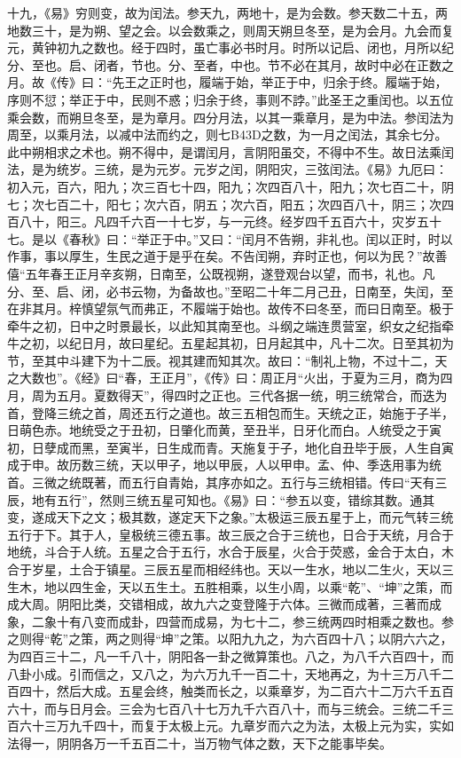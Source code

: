 \documentclass[]{article}
\begin{document}
十九，《易》穷则变，故为闰法。参天九，两地十，是为会数。参天数二十五，两地数三十，是为朔、望之会。以会数乘之，则周天朔旦冬至，是为会月。九会而复元，黄钟初九之数也。经于四时，虽亡事必书时月。时所以记启、闭也，月所以纪分、至也。启、闭者，节也。分、至者，中也。节不必在其月，故时中必在正数之月。故《传》曰：``先王之正时也，履端于始，举正于中，归余于终。履端于始，序则不愆；举正于中，民则不惑；归余于终，事则不誖。''此圣王之重闰也。以五位乘会数，而朔旦冬至，是为章月。四分月法，以其一乘章月，是为中法。参闰法为周至，以乘月法，以减中法而约之，则七B43D之数，为一月之闰法，其余七分。此中朔相求之术也。朔不得中，是谓闰月，言阴阳虽交，不得中不生。故日法乘闰法，是为统岁。三统，是为元岁。元岁之闰，阴阳灾，三弦闰法。《易》九厄曰：初入元，百六，阳九；次三百七十四，阳九；次四百八十，阳九；次七百二十，阴七；次七百二十，阳七；次六百，阴五；次六百，阳五；次四百八十，阴三；次四百八十，阳三。凡四千六百一十七岁，与一元终。经岁四千五百六十，灾岁五十七。是以《春秋》曰：``举正于中。''又曰：``闰月不告朔，非礼也。闰以正时，时以作事，事以厚生，生民之道于是乎在矣。不告闰朔，弃时正也，何以为民？''故善僖``五年春王正月辛亥朔，日南至，公既视朔，遂登观台以望，而书，礼也。凡分、至、启、闭，必书云物，为备故也。''至昭二十年二月己丑，日南至，失闰，至在非其月。梓慎望氛气而弗正，不履端于始也。故传不曰冬至，而曰日南至。极于牵牛之初，日中之时景最长，以此知其南至也。斗纲之端连贯营室，织女之纪指牵牛之初，以纪日月，故曰星纪。五星起其初，日月起其中，凡十二次。日至其初为节，至其中斗建下为十二辰。视其建而知其次。故曰：``制礼上物，不过十二，天之大数也''。《经》曰``春，王正月''，《传》曰：周正月``火出，于夏为三月，商为四月，周为五月。夏数得天''，得四时之正也。三代各据一统，明三统常合，而迭为首，登降三统之首，周还五行之道也。故三五相包而生。天统之正，始施于子半，日萌色赤。地统受之于丑初，日肇化而黄，至丑半，日牙化而白。人统受之于寅初，日孽成而黑，至寅半，日生成而青。天施复于子，地化自丑毕于辰，人生自寅成于申。故历数三统，天以甲子，地以甲辰，人以甲申。孟、仲、季迭用事为统首。三微之统既著，而五行自青始，其序亦如之。五行与三统相错。传曰``天有三辰，地有五行''，然则三统五星可知也。《易》曰：``参五以变，错综其数。通其变，遂成天下之文；极其数，遂定天下之象。''太极运三辰五星于上，而元气转三统五行于下。其于人，皇极统三德五事。故三辰之合于三统也，日合于天统，月合于地统，斗合于人统。五星之合于五行，水合于辰星，火合于荧惑，金合于太白，木合于岁星，土合于镇星。三辰五星而相经纬也。天以一生水，地以二生火，天以三生木，地以四生金，天以五生土。五胜相乘，以生小周，以乘``乾''、``坤''之策，而成大周。阴阳比类，交错相成，故九六之变登隆于六体。三微而成著，三著而成象，二象十有八变而成卦，四营而成易，为七十二，参三统两四时相乘之数也。参之则得``乾''之策，两之则得``坤''之策。以阳九九之，为六百四十八；以阴六六之，为四百三十二，凡一千八十，阴阳各一卦之微算策也。八之，为八千六百四十，而八卦小成。引而信之，又八之，为六万九千一百二十，天地再之，为十三万八千二百四十，然后大成。五星会终，触类而长之，以乘章岁，为二百六十二万六千五百六十，而与日月会。三会为七百八十七万九千六百八十，而与三统会。三统二千三百六十三万九千四十，而复于太极上元。九章岁而六之为法，太极上元为实，实如法得一，阴阴各万一千五百二十，当万物气体之数，天下之能事毕矣。
\end{document}
